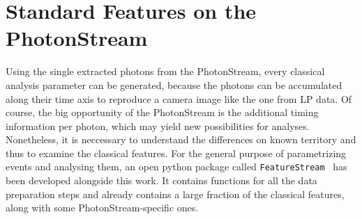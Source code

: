 \section{Standard Features on the PhotonStream}\label{sec:features_phs}
%
Using the single extracted photons from the PhotonStream, every classical
analysis parameter can be generated, because the photons can be accumulated
along their time axis to reproduce a camera image like the one from LP data. Of
course, the big opportunity of the PhotonStream is the additional timing
information per photon, which may yield new possibilities for analyses.
Nonetheless, it is neccessary to understand the differences on known territory
and thus to examine the classical features. For the general purpose of
parametrizing events and analysing them, an open python package called
\texttt{FeatureStream}~\cite{FeatureStream} has been developed alongside this work. It contains
functions for all the data preparation steps and already contains a large
fraction of the classical features, along with some PhotonStream-specific ones.

